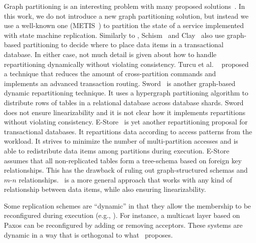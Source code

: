Graph partitioning is an interesting problem with many proposed solutions~\cite{Abou-Rjeili:2006,hendrickson2000graph,kernighan1970efficient,7004087}.
In this work, we do not introduce a new graph partitioning solution, but instead we use a well-known one (METIS~\cite{Abou-Rjeili:2006}) to partition the state of a service implemented with state machine replication.
Similarly to \dynastar{}, Schism~\cite{curino2010sch} and Clay~\cite{SerafiniTEPAS16} also use graph-based partitioning to decide where to place data items in a transactional database.
In either case, not much detail is given about how to handle repartitioning dynamically without violating consistency.
Turcu et al. ~\cite{7004087} proposed a technique that reduces the amount of cross-partition commands and implements an advanced transaction routing.
Sword~\cite{quamar2013sword} is another graph-based dynamic repartitioning technique.
It uses a hypergraph partitioning algorithm to distribute rows of tables in a relational database across database shards.
Sword does not ensure linearizability and it is not clear how it implements repartitions without violating consistency.
E-Store~\cite{taft2014est} is yet another repartitioning proposal for transactional databases.
It repartitions data according to access patterns from the workload.
It strives to minimize the number of multi-partition accesses and is able to redistribute data items among partitions during execution.
E-Store assumes that all non-replicated tables form a tree-schema based on foreign key relationships.
This has the drawback of ruling out graph-structured schemas and \mbox{$m$-$n$} relationships.
\dynastar\ is a more general approach that works with any kind of relationship between data items, while also ensuring linearizability.

Some replication schemes are ``dynamic'' in that they allow the membership to be reconfigured during execution (e.g., \cite{birman2010dsr,dustdar2007soc,guessoum2003dar}).
For instance, a multicast layer based on Paxos can be reconfigured by adding or removing acceptors. 
These systems are dynamic in a way that is orthogonal to what \dynastar\ proposes.

